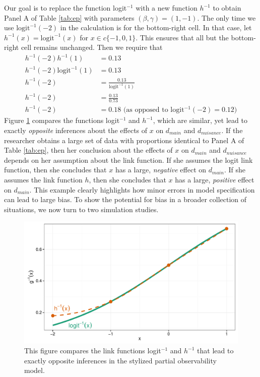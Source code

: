 \documentclass[10pt]{article}
\begin{document}
Our goal is to replace the function logit$^{-1}$ with a new function $h^{-1}$ to obtain Panel A of Table \ref{tab:ep} with parameters $(\beta, \gamma) = (1, -1)$. 
The only time we use $\text{logit}^{-1} (-2)$ in the calculation is for the bottom-right cell. In that case, let $h^{-1}(x) = \text{logit}^{-1}(x)$ for $x \in c\{ -1, 0, 1\}$. 
This ensures that all but the bottom-right cell remains unchanged. 
Then we require that 
\begin{align*}
h^{-1}(-2)h^{-1}(1) &= 0.13\\
h^{-1}(-2)\text{logit}^{-1}(1) &= 0.13\\
h^{-1}(-2) &= \frac{0.13}{\text{logit}^{-1}(1)}\\
h^{-1}(-2) &= \frac{0.13}{0.73}\\
h^{-1}(-2) & = 0.18 \text{ (as opposed to logit$^{-1}(-2) = 0.12$)}
\end{align*}
Figure \ref{fig:example} compares the functions logit$^{-1}$ and $h^{-1}$, which are similar, yet lead to exactly \textit{opposite} inferences about the effects of $x$ on $d_{main}$ and $d_{nuisance}$. 
If the researcher obtains a large set of data with proportions identical to Panel A of Table \ref{tab:ep}, then her conclusion about the effects of $x$ on $d_{main}$ and $d_{nuisance}$ depends on her assumption about the link function. 
If she assumes the logit link function, then she concludes that $x$ has a large, \textit{negative} effect on $d_{main}$. 
If she assumes the link function $h$, then she concludes that $x$ has a large, \textit{positive} effect on $d_{main}$. 
This example clearly highlights how minor errors in model specification can lead to large bias. 
To show the potential for bias in a broader collection of situations, we now turn to two simulation studies.

\begin{figure}[h]
\begin{center}
\includegraphics[scale = .6]{figs/example.pdf}
\caption{This figure compares the link functions logit$^{-1}$ and $h^{-1}$ that lead to exactly opposite inferences in the stylized partial observability model.}\label{fig:example}
\end{center}
\end{figure}
\end{document}
